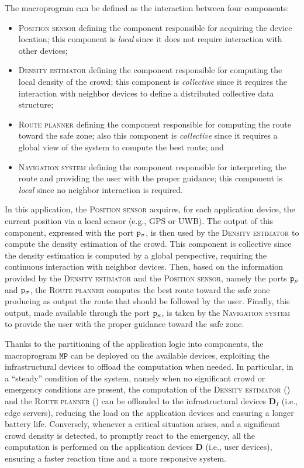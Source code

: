 The macroprogram can be defined as the interaction between four components:
\begin{itemize}
  \item \textsc{Position sensor} \PositionSensor{} defining the component responsible for acquiring the device location; this component is \emph{local} since it does not require interaction with other devices;
  \item \textsc{Density estimator} \DensityEstimation{} defining the component responsible for computing the local density of the crowd; this component is \emph{collective} since it requires the interaction with neighbor devices to define a distributed collective data structure;
  \item \textsc{Route planner} \Router{} defining the component responsible for computing the route toward the safe zone; also this component is \emph{collective} since it requires a global view of the system to compute the best route; and
  \item \textsc{Navigation system} \GuidanceActuator{} defining the component responsible for interpreting the route and providing the user with the proper guidance; this component is \emph{local} since no neighbor interaction is required.
\end{itemize}

%
In this application,
 the \textsc{Position sensor} acquires,
 for each application device,
 the current position via a local sensor (e.g., GPS or UWB).
%
The output of this component,
 expressed with the port $\mathtt{p}_\sigma$,
 is then used by the \textsc{Density estimator} to compute the density estimation of the crowd.
%
This component is collective since the density estimation is computed by a global perspective,
 requiring the continuous interaction with neighbor devices.
%
Then,
 based on the information provided by the \textsc{Density estimator} and the \textsc{Position sensor},
 namely the ports $\mathtt{p}_\rho$ and $\mathtt{p}_\sigma$,
 the \textsc{Route planner} computes the best route toward the safe zone producing as output the route that should be followed by the user.
%
Finally,
 this output,
 made available through the port $\mathtt{p}_\kappa$,
 is taken by the \textsc{Navigation system} to provide the user with the proper guidance toward the safe zone.

Thanks to the partitioning of the application logic into components,
 the macroprogram $\mathtt{MP}$ can be deployed on the available devices,
 exploiting the infrastructural devices to offload the computation when needed.
%
In particular,
 in a ``steady'' condition of the system,
 namely when no significant crowd or emergency conditions are present,
 the computation of the \textsc{Density estimator} (\DensityEstimation) and the \textsc{Route planner} (\Router) 
 can be offloaded to the infrastructural devices $\mathbf{D}_I$ (i.e., edge servers),
 reducing the load on the application devices and ensuring a longer battery life.
%
Conversely,
 whenever a critical situation arises,
 and a significant crowd density is detected,
 to promptly react to the emergency,
 all the computation is performed on the application devices $\mathbf{D}$ (i.e., user devices),
 ensuring a faster reaction time and a more responsive system.

